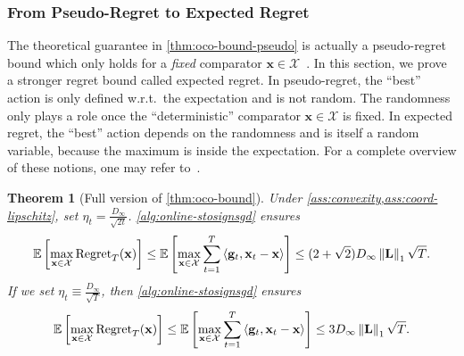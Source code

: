 \documentclass{article}
\newtheorem{thm}{Theorem}
\def \E {\mathbb{E}}
\def \x {\mathbf{x}}
\def \g {\mathbf{g}}
\def \Lb {\mathbf{L}}
\def \X {\mathcal{X}}
\newcommand{\inner}[2]{\left\langle #1, #2 \right\rangle}
\newcommand{\norm}[1]{\left\Vert#1\right\Vert}
\newcommand{\sqbrac}[1]{\left[#1\right]}
\begin{document}
\subsubsection{From Pseudo-Regret to Expected Regret\label{app:sec:pseudo2expected}}

The theoretical guarantee in \cref{thm:oco-bound-pseudo} is actually a pseudo-regret bound which only holds for a \emph{fixed} comparator $\x\in\X$~\citep{bubeck2012regret}. In this section, we prove a stronger regret bound called expected regret. In pseudo-regret, the ``best'' action is only defined w.r.t.~the expectation and is not random. The randomness only plays a role once the ``deterministic'' comparator $\x\in\X $ is fixed. In expected regret, the ``best'' action depends on the randomness and is itself a random variable, because the maximum is inside the expectation. For a complete overview of these notions, one may refer to~\citep{bubeck2012regret,lattimore2020bandit}.

\begin{thm}[Full version of \cref{thm:oco-bound}]\label{thm:oco-bound-expected}
    Under \cref{ass:convexity,ass:coord-lipschitz}, set $\eta_t=\frac{D_\infty}{\sqrt{2t}}$. \cref{alg:online-stosignsgd} ensures 
    \begin{align*}
        \E\sqbrac{\max_{\x\in\X}\textnormal{Regret}_T(\x)}\le\E\sqbrac{\max_{\x\in\X}\sum_{t=1}^T\inner{\g_t}{\x_t-\x}}\le(2+\sqrt{2})D_\infty\norm{\Lb}_1\sqrt{T}.
    \end{align*}
    If we set $\eta_t\equiv\frac{D_\infty}{\sqrt{T}}$, then \cref{alg:online-stosignsgd} ensures 
    \begin{align*}
        \E\sqbrac{\max_{\x\in\X}\textnormal{Regret}_T(\x)}\le\E\sqbrac{\max_{\x\in\X}\sum_{t=1}^T\inner{\g_t}{\x_t-\x}}\le3D_\infty\norm{\Lb}_1\sqrt{T}.
    \end{align*}
\end{thm}
\end{document}
